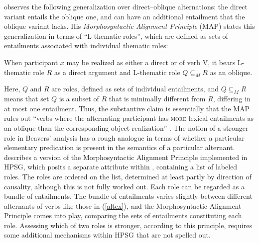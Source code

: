\documentclass[output=paper,biblatex,babelshorthands,newtxmath,draftmode,colorlinks, citecolor=brown]{langscibook}
\begin{document}

\citet{Beavers2010} observes the following generalization over direct--oblique alternations:  the direct variant entails the oblique one, and can have an additional entailment that the oblique variant lacks.  
His \emph{Morphosyntactic Alignment Principle} (MAP) states this generalization in terms of ``L-thematic roles'', which are defined as sets of entailments associated with individual thematic roles:   

\begin{exe}
\ex\label{beavers-map}
When participant $x$ may be realized as either a direct or  of verb V, it bears L-thematic role $R$ as a direct argument and L-thematic role $Q\subseteq_{M}R$ as an oblique.
\citep[848]{Beavers2010}
\end {exe}

\noindent
Here, $Q$ and $R$ are roles, defined as sets of individual entailments, and  $Q\subseteq_{M}R$ means that set $Q$ is a subset of $R$ that is minimally different from $R$, differing in at most one entailment.
Thus, the substantive claim is essentially that the MAP rules out ``verbs where the alternating participant has \textsc{more} lexical entailments as an oblique than the corresponding object realization'' \citep[849]{Beavers2010}.
The notion of a stronger role in Beavers' analysis has a rough analogue in terms of whether a particular elementary predication is present in the semantics of a particular alternant.
\citet{Beavers2005} describes a version of the Morphosyntactic Alignment Principle implemented in HPSG, which posits a separate  attribute within , containing a list of labeled roles.
The roles are ordered on the  list, determined at least partly by direction of causality, although this is not fully worked out.
Each role can be regarded as a bundle of entailments.
The bundle of entailments varies slightly between different alternants of verbs like those in (\ref{altex}), and the Morphosyntactic Alignment Principle comes into play, comparing the sets of entailments constituting each role.
Assessing which of two roles is stronger, according to this principle, requires some additional mechanisms within HPSG that are not spelled out.
\end{document}
